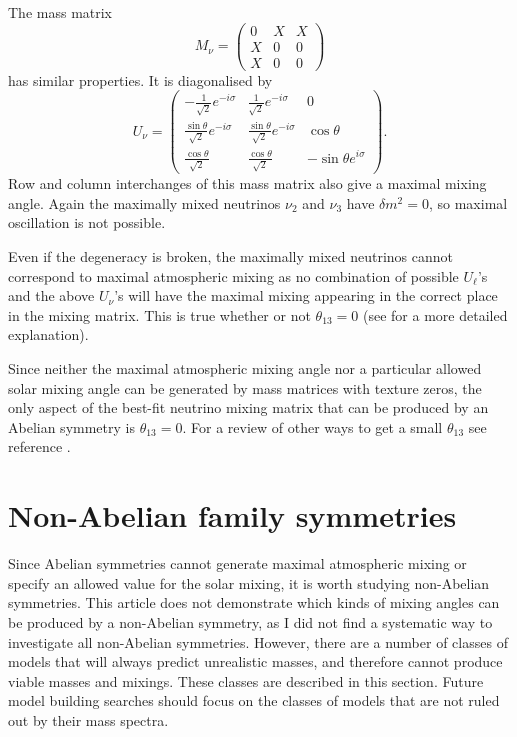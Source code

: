 \documentclass[nofootinbib,showpacs]{revtex4}
\begin{document}
The mass matrix 
\begin{equation}
M_\nu=\left(\begin{array}{ccc}0&X&X\\X&0&0\\X&0&0\end{array}\right)
\end{equation}
has similar properties. It is diagonalised by 
\begin{equation}\label{maxsol}
 U_\nu=\left(\begin{array}{ccc} -\frac{1}{\sqrt{2}}e^{-i \sigma} & \frac{1}{\sqrt{2}}e^{-i \sigma} & 0 \\ 
\frac{\sin \theta}{\sqrt{2}} e^{-i \sigma} & \frac{\sin \theta}{\sqrt{2}} e^{-i \sigma} & \cos \theta \\ 
\frac{\cos \theta}{\sqrt{2}} & \frac{\cos \theta}{\sqrt{2}} & -\sin \theta e^{i \sigma}
\end{array} \right).
\end{equation}
Row and column interchanges of this mass matrix also give a maximal mixing angle. Again the maximally mixed neutrinos $\nu_2$ and $\nu_3$ have $\delta m^2=0$, so maximal oscillation is not possible.

Even if the degeneracy is broken, the maximally mixed neutrinos 
cannot correspond to maximal atmospheric mixing as no combination of possible $U_\ell$'s and the above $U_\nu$'s will have the maximal mixing appearing in the correct place in the mixing matrix. This is true whether or not $\theta_{13}=0$ (see \cite{nogo2} for a more detailed explanation).

Since neither the maximal atmospheric mixing angle nor a particular allowed solar mixing angle can be generated by mass matrices with texture zeros, the only aspect of the best-fit neutrino mixing matrix that can be produced by an Abelian symmetry is $\theta_{13}=0$. For a review of other ways to get a small $\theta_{13}$ see reference \cite{joshtheta13}.  






\section{Non-Abelian family symmetries}\label{nonab}

Since Abelian symmetries cannot generate maximal atmospheric mixing or specify an allowed value for the solar mixing, it is worth studying non-Abelian symmetries.
This article does not demonstrate which kinds of mixing angles can be produced by a non-Abelian symmetry, as I did not find a systematic way to investigate all non-Abelian symmetries. However, there are a number of classes of models that will always predict unrealistic masses, and therefore cannot produce viable masses and mixings. These classes are described in this section. Future model building searches should focus on the classes of models that are not ruled out by their mass spectra.
\end{document}
